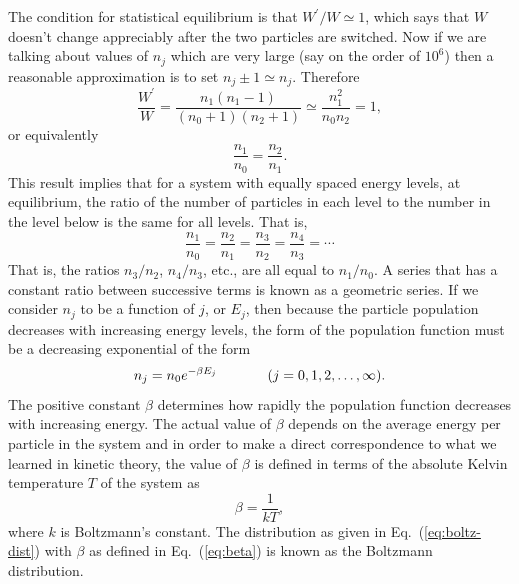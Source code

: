 The condition for statistical equilibrium is that $W^\prime/W \simeq 1$, 
which says that $W$ doesn't change appreciably after the two particles
are switched.  Now if we are talking about values of $n_j$ which are 
very large (say on the order of $10^6$) then a reasonable approximation 
is to set $n_j\pm 1 \simeq n_j$.  Therefore
\begin{equation}
\frac{W^\prime}{W} = \frac{n_1(n_1-1)}{(n_0+1)(n_2+1)}
                   \simeq \frac{n_1^2}{n_0 n_2} = 1, 
\end{equation}
or equivalently
\begin{equation}
\frac{n_1}{n_0} = \frac{n_2}{n_1}.
\end{equation}
This result implies that for a system with equally spaced energy 
levels, at equilibrium, the ratio of the number of particles in 
each level to the number in the level below is the same for all 
levels.  That is,
\begin{equation}
\frac{n_1}{n_0} = \frac{n_2}{n_1}=  \frac{n_3}{n_2}= \frac{n_4}{n_3} = \cdots
\end{equation}
That is, the ratios $n_3 /n_2$, $n_4 /n_3$, etc., are all equal to
$n_1/n_0$.  A series that has a constant ratio between successive
terms is known as a geometric series.  If we consider $n_j$ to be a
function of $j$, or $E_j$, then because the particle population decreases
with increasing energy levels, the form of the population function
must be a decreasing exponential of the form
\begin{equation}
n_j = n_0 e^{-\beta E_j}\text{\hspace{0.5in}}(j = 0, 1, 2,\dots, \infty).
\label{eq:boltz-dist}
\end{equation}
The positive constant $\beta$ determines how rapidly the population
function decreases with increasing energy.  The actual value of
$\beta$ depends on the average energy per particle in the system and
in order to make a direct correspondence to what we learned in kinetic
theory, the value of $\beta$ is defined in terms of the absolute
Kelvin temperature $T$ of the system as
\begin{equation}
\beta = \frac{1}{kT},
\label{eq:beta}
\end{equation}
where $k$ is Boltzmann's constant.  The distribution as given in
Eq.~(\ref{eq:boltz-dist}) with $\beta$ as defined in
Eq.~(\ref{eq:beta}) is known as the Boltzmann distribution.
     

